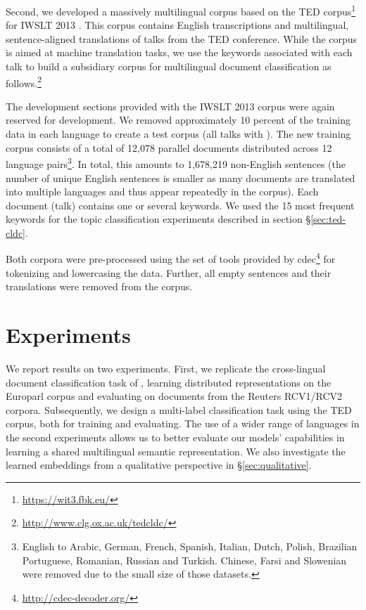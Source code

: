 \documentclass[11pt]{article}
\begin{document}
Second, we developed a massively multilingual corpus based on the TED
corpus\footnote{\url{https://wit3.fbk.eu/}} for IWSLT 2013 \cite{Cettolo:2012}.
This corpus contains English transcriptions and multilingual, sentence-aligned
translations of talks from the TED conference.  While the corpus is aimed at
machine translation tasks, we use the keywords associated with each talk to
build a subsidiary corpus for multilingual document classification as
follows.\footnote{\url{http://www.clg.ox.ac.uk/tedcldc/}}

The development sections provided with the IWSLT 2013 corpus were again reserved
for development.  We removed approximately 10 percent of the training data in
each language to create a test corpus (all talks with ).  The new
training corpus consists of a total of 12,078 parallel documents distributed
across 12 language pairs\footnote{English to Arabic, German, French, Spanish,
  Italian, Dutch, Polish, Brazilian Portuguese, Romanian, Russian and Turkish.
  Chinese, Farsi and Slowenian were removed due to the small size of those
  datasets.}. In total, this amounts to 1,678,219 non-English sentences (the
  number of unique English sentences is smaller as many documents are translated
  into multiple languages and thus appear repeatedly in the corpus).  Each
document (talk) contains one or several keywords.  We used the 15 most frequent
keywords for the topic classification experiments described in section
\S\ref{sec:ted-cldc}.

Both corpora were pre-processed using the set of tools provided by
cdec\footnote{\url{http://cdec-decoder.org/}} for tokenizing and
lowercasing the data.  Further, all empty sentences and their translations were
removed from the corpus.
 \section{Experiments}

We report results on two experiments. First, we replicate the cross-lingual
document classification task of , learning distributed
representations on the Europarl corpus and evaluating on documents from the
Reuters RCV1/RCV2 corpora.  Subsequently, we design a multi-label classification
task using the TED corpus, both for training and evaluating.  The use of a wider
range of languages in the second experiments allows
us to better evaluate our models' capabilities in
learning a shared multilingual semantic representation.  We also investigate the
learned embeddings from a qualitative perspective in \S\ref{sec:qualitative}.
\end{document}
